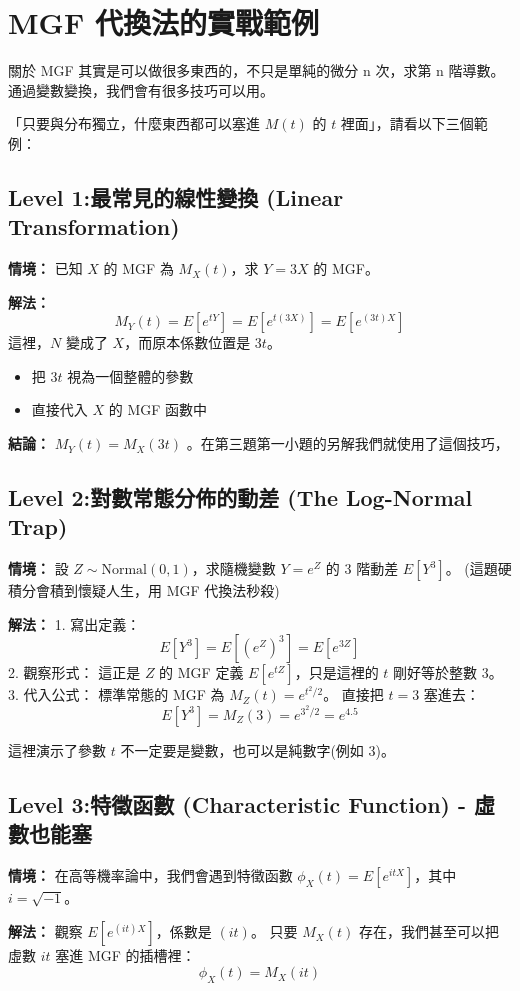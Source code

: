 \documentclass{article}
\begin{document}
\section*{MGF 代換法的實戰範例}
關於 MGF 其實是可以做很多東西的，不只是單純的微分 n 次，求第 n 階導數。
通過變數變換，我們會有很多技巧可以用。

\noindent
「只要與分布獨立，什麼東西都可以塞進 $M(t)$ 的 $t$ 裡面」，請看以下三個範例：

\subsection*{Level 1:最常見的線性變換 (Linear Transformation)}
\textbf{情境：} 已知 $X$ 的 MGF 為 $M_X(t)$，求 $Y = 3X$ 的 MGF。

\textbf{解法：}
$$ M_Y(t) = E[e^{tY}] = E[e^{t(3X)}] = E[e^{(3t)X}] $$
這裡，$N$ 變成了 $X$，而原本係數位置是 $3t$。
\begin{itemize}
    \item 把 $3t$ 視為一個整體的參數
    \item 直接代入 $X$ 的 MGF 函數中
\end{itemize}
\textbf{結論：} $M_Y(t) = M_X(3t)$ 。在第三題第一小題的另解我們就使用了這個技巧， 

\subsection*{Level 2:對數常態分佈的動差 (The Log-Normal Trap)}
\textbf{情境：} 設 $Z \sim \text{Normal}(0, 1)$，求隨機變數 $Y = e^Z$ 的 3 階動差 $E[Y^3]$。
(這題硬積分會積到懷疑人生，用 MGF 代換法秒殺)

\textbf{解法：}
1. 寫出定義：
$$ E[Y^3] = E[(e^Z)^3] = E[e^{3Z}] $$
2. 觀察形式：
這正是 $Z$ 的 MGF 定義 $E[e^{tZ}]$，只是這裡的 $t$ 剛好等於整數 $3$。
3. 代入公式：
標準常態的 MGF 為 $M_Z(t) = e^{t^2/2}$。
直接把 $t=3$ 塞進去：
$$ E[Y^3] = M_Z(3) = e^{3^2/2} = e^{4.5} $$

這裡演示了參數 $t$ 不一定要是變數，也可以是純數字(例如 3)。

\subsection*{Level 3:特徵函數 (Characteristic Function) - 虛數也能塞}
\textbf{情境：} 在高等機率論中，我們會遇到特徵函數 $\phi_X(t) = E[e^{itX}]$，其中 $i = \sqrt{-1}$。

\textbf{解法：}
觀察 $E[e^{(it)X}]$，係數是 $(it)$。
只要 $M_X(t)$ 存在，我們甚至可以把虛數 $it$ 塞進 MGF 的插槽裡：
$$ \phi_X(t) = M_X(it) $$
\end{document}
